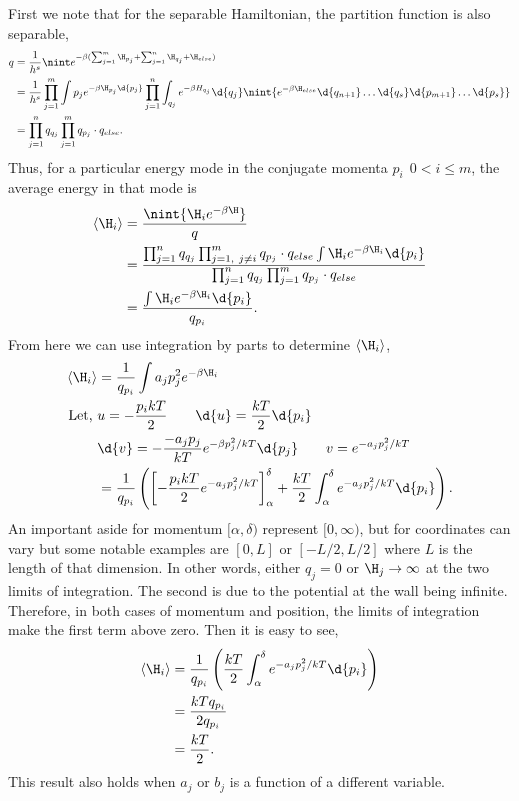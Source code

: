 First we note that for the separable Hamiltonian, the partition function is also
separable,
\begin{align*}
	q &= \frac{1}{h^{s}}\nint e^{-\beta(\sum_{j=1}^{m}{\H_{p_{j}}} +
	\sum_{j=1}^{n}{\H_{q_{j}}} + \H_{else})}\\
	  &= \frac{1}{h^{s}}\prod_{j=1}^{m}{%
		  \int{p_{j}}{e^{-\beta \H_{p_{j}}\d{p_{j}}}}%
	  }
		  \prod_{j=1}^{n}{\int_{q_{j}}{e^{-\beta H_{q_{j}}}\d{q_{j}}}}
		  \nint{e^{-\beta \H_{else}} \d{q_{n+1}} \ldots \d{q_{s}} \d{p_{m+1}}
		  \ldots \d{p_{s}}}\\
	  &= \prod_{j=1}^{n}{q_{q_{j}}} \prod_{j=1}^{m}{q_{p_{j}}} \cdot q_{else}.
\end{align*}
Thus, for a particular energy mode in the conjugate momenta $p_{i}~~ 0 < i \le
m$, the average energy in that mode is
\begin{align*}
	\langle \H_{i} \rangle &= \frac{\nint{\H_{i}e^{-\beta\H}}}{q}\\
						   &= \frac{%
							   \prod_{j=1}^{n}{q_{q_{j}}}%
							   \prod_{j=1,~j \ne i}^{m}{q_{p_{j}}}%
							   \cdot q_{else}
						   \int{\H_{i}e^{-\beta\H_{i}}\d{p_{i}}}}
						   {\prod_{j=1}^{n}{q_{q_{j}}}%
							\prod_{j=1}^{m}{q_{p_{j}}}%
					\cdot q_{else}}\\
						   &= \frac{\int{\H_{i}e^{-\beta\H_{i}}\d{p_{i}}}}
						   {q_{p_{i}}}.
\end{align*}
From here we can use integration by parts to determine $\langle \H_{i} \rangle$,
\begin{align*}
	\langle \H_{i} \rangle &= \frac{1}{q_{p_{i}}} \int{a_{j}p_{j}^{2} e^{-\beta
	\H_{i}}}\\
			\text{Let, } &u = -\frac{p_{i} kT}{2} \qquad \d{u} =
			\frac{kT}{2}\d{p_{i}}\\
						 &\d{v} = -\frac{-a_{j}p_{j}}{kT}e^{-\beta
						 p_{j}^{2}/kT}\d{p_{j}} \qquad
						 v = e^{-a_{j}p_{j}^{2}/kT}\\
						 &= \frac{1}{q_{p_{i}}} \left(
							 \left[-\frac{p_{i} kT}{2} e^{-a_{j}p_{j}^{2}/kT}
							 \right]_{\alpha}^{\delta} +
							 \frac{kT}{2} \int_{\alpha}^{\delta}{%
						 e^{-a_{j}p_{j}^{2}/kT}\d{p_{i}}}\right).
\end{align*}
An important aside for momentum $[\alpha, \delta)$ represent $[0,\infty)$, but
for coordinates can vary but some notable examples are  $[0, L]$ or  $[-L/2,
L/2]$ where  $L$ is the length of that dimension. In other words, either $q_{j}
= 0$ or $\H_{j}\to\infty$ at the two limits of integration. The second is due to
the potential at the wall being infinite. Therefore, in both cases of momentum
and position, the limits of integration make the first term above zero. Then it
is easy to see,
\begin{align*}
		\langle \H_{i} \rangle &= \frac{1}{q_{p_{i}}} \left(
						\frac{kT}{2} \int_{\alpha}^{\delta}{%
						e^{-a_{j}p_{j}^{2}/kT}\d{p_{i}}}\right)\\
							   &= \frac{kTq_{p_{i}}}{2q_{p_{i}}}\\
							   &= \frac{kT}{2}.
\end{align*}
This result also holds when $a_{j}$ or $b_{j}$ is a function of a different
variable.
